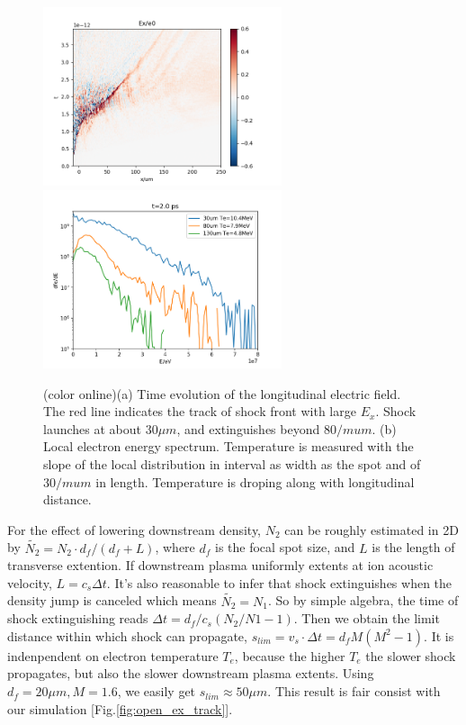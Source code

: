 \documentclass[12pt]{iopart}
\begin{document}
\begin{figure}[htbp]
    \centering
    \includegraphics[width=7cm]{ex_trace.png}\label{fig:open_ex_track}
    \includegraphics[width=7cm]{Te_x.png}\label{fig:open_Te}
    \caption{(color online)(a) Time evolution of the longitudinal electric field. The red line indicates the track of shock front with large $E_x$. Shock launches at about $30\mu m$, and extinguishes beyond $80/mu m$. (b) Local electron energy spectrum. Temperature is measured with the slope of the local distribution in interval as width as the spot and of $30/mu m$ in length. Temperature is droping along with longitudinal distance.}
\end{figure}

For the effect of lowering downstream density, $N_2$ can be roughly estimated in 2D by $\tilde{N_2}=N_2 \cdot d_f\big/(d_f+L)$, where $d_f$ is the focal spot size, and $L$ is the length of transverse extention. If downstream plasma uniformly extents at ion acoustic velocity, $L=c_s\Delta t$. It's also reasonable to infer that shock extinguishes when the density jump is canceled which means $\tilde{N_2}=N_1$. So by simple algebra, the time of shock extinguishing reads $\Delta t=d_f/c_s(N_2/N1-1)$. Then we obtain the limit distance within which shock can propagate, $s_{lim}=v_s \cdot \Delta t=d_fM(M^2-1)$. It is indenpendent on electron temperature $T_e$, because the higher $T_e$ the slower shock propagates, but also the slower downstream plasma extents. Using $d_f=20\mu m,M=1.6$, we easily get $s_{lim}\approx 50\mu m$. This result is fair consist with our simulation [Fig.\ref{fig:open_ex_track}].
\end{document}
